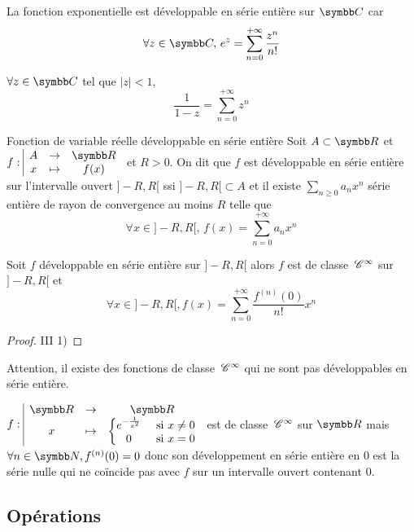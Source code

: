 \begin{exemple}
    La fonction exponentielle est développable en série entière sur $\C$ car 
    $$\forall z \in \C, \, e^z = \sum_{n = 0}^{+\infty} \frac{z^n}{n!}$$

    \lvspace $\forall z \in \C$ tel que $|z| < 1$,
    $$\frac 1 {1 - z} = \sum_{n = 0}^{+\infty} z^n$$
\end{exemple}

\begin{definitionnt}{Fonction de variable réelle développable en série entière}{}
    Soit $A \subset \R$ et $\fonction{f}{A}{\R}{x}{f(x)}$ et $R > 0$. On dit que $f$ est développable
    en série entière sur l'intervalle ouvert $]-R, R[$ ssi $]-R, R[ \subset A$ et il 
    existe $\sum_{n \geqslant 0 } a_n x^n$ série entière de rayon de convergence au moins $R$ telle que
    $$\forall x \in ]-R, R[, \, f(x) = \sum_{n = 0}^{+\infty} a_n x^n$$
\end{definitionnt}

\begin{proposition}{}{}
    Soit $f$ développable en série entière sur $] - R, R[$ alors $f$ est de classe
    $\,\mathscr C^{\infty}$ sur $]-R, R[$ et 
    $$\forall x \in ]-R, R[, 
    f(x) = \sum_{n = 0}^{+\infty} \frac{f^{(n)}(0)}{n!} x^n$$
\end{proposition}

\begin{proof}
    III 1)
\end{proof}

\begin{remarque}
    Attention, il existe des fonctions de classe $\,\mathscr C^{\infty}$ qui ne sont pas
    développables en série entière.
\end{remarque}

\begin{exemple}
    $\fonction{f}{\R}{\R}{x}{\left\{ \begin{matrix}
        e^{- \frac 1 {x^2}} & \text{ si } x \neq 0 \\
        0 & \text{ si } x = 0
    \end{matrix} \right.}$ est de classe $\,\mathscr C^{\infty}$ sur $\R$ mais 
    $\forall n \in \N, f^{(n)}(0) = 0$ donc son développement en série entière en $0$ est
    la série nulle qui ne coïncide pas avec $f$ sur un intervalle ouvert contenant $0$.
\end{exemple}

\subsection{Opérations}

